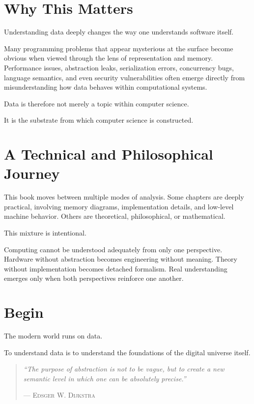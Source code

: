 \section*{Why This Matters}

Understanding data deeply changes the way one understands software itself.

Many programming problems that appear mysterious at the surface become obvious when viewed through the lens of representation and memory. Performance issues, abstraction leaks, serialization errors, concurrency bugs, language semantics, and even security vulnerabilities often emerge directly from misunderstanding how data behaves within computational systems.

Data is therefore not merely a topic within computer science.

It is the substrate from which computer science is constructed.

\section*{A Technical and Philosophical Journey}

This book moves between multiple modes of analysis. Some chapters are deeply practical, involving memory diagrams, implementation details, and low-level machine behavior. Others are theoretical, philosophical, or mathematical.

This mixture is intentional.

Computing cannot be understood adequately from only one perspective. Hardware without abstraction becomes engineering without meaning. Theory without implementation becomes detached formalism. Real understanding emerges only when both perspectives reinforce one another.

\section*{Begin}

The modern world runs on data.

To understand data is to understand the foundations of the digital universe itself.

\vfill

\begin{quote}
\textit{``The purpose of abstraction is not to be vague, but to create a new semantic level in which one can be absolutely precise.''}

\hfill--- \textsc{Edsger W. Dijkstra}
\end{quote}

\clearpage